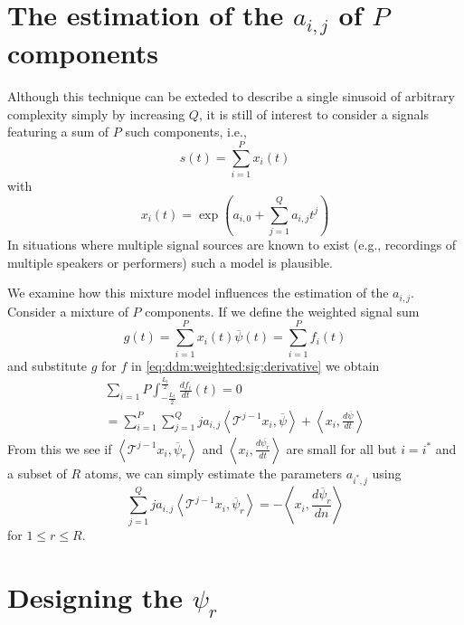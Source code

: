 \documentclass[twoside,a4paper]{article}
\begin{document}
\section{The estimation of the $a_{i,j}$ of $P$ components}

Although this technique can be exteded to describe a single
sinusoid of arbitrary complexity simply by increasing $Q$, it is still of
interest to consider a signals featuring a sum of $P$ such components, i.e.,
%
\begin{equation}
    \label{eq:polyphaseexpmix}
    s(t) = \sum_{i=1}^{P} x_{i}(t)
\end{equation}
%
with
%
\[
    x_{i}(t) = \exp(a_{i,0} + \sum_{j=1}^{Q} a_{i,j} t^j)
\]
%
In situations where multiple signal sources are known to exist (e.g., recordings
of multiple speakers or performers) such a model is plausible.

We examine how this mixture model influences the estimation of the $a_{i,j}$.
Consider a mixture of $P$ components.
If we define the weighted signal sum
%
\[
    g(t) = \sum_{i=1}^{P} x_{i}(t) \overline{\psi}(t) = \sum_{i=1}^{P} f_{i}(t)
\]
%
and substitute $g$ for $f$ in \ref{eq:ddm:weighted:sig:derivative} we obtain
%
\begin{multline}
    \sum_{i=1}{P} \int_{-\frac{L_{t}}{2}}^{\frac{L_{t}}{2}} \frac{df_{i}}{dt}(t) =
    0
    \\ = 
    \sum_{i=1}^{P}
    \sum_{j=1}^{Q} j a_{i,j} 
    \left\langle \mathcal{T}^{j-1} x_i , \overline{\psi} \right\rangle
     + \left\langle x_i, \frac{d\overline{\psi}}{dt} \right\rangle
\end{multline}
%
From this we see if $\left\langle \mathcal{T}^{j-1} x_i , \overline{\psi}_{r}
\right\rangle$ and $\left\langle x_i, \frac{d\overline{\psi_{r}}}{dt} \right\rangle$
are small for all but $i = i^{\ast}$ and a subset of $R$ atoms, we
can simply estimate the parameters $a_{i^{\ast},j}$ using
\[
    \sum_{j=1}^{Q} j a_{i,j} 
    \left\langle \mathcal{T}^{j-1} x_i , \overline{\psi}_{r} \right\rangle
    = -\left\langle x_i, \frac{d\overline{\psi}_{r}}{dn} \right\rangle
\]
for $1 \leq r \leq R$.

\section{Designing the $\psi_{r}$}
\label{sec:designingatoms}
\end{document}
